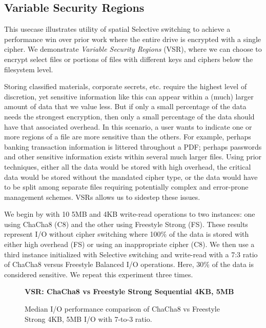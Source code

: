 \subsection{Variable Security Regions} \label{subsec:uc2}

This usecase illustrates utility of spatial Selective switching to achieve a
performance win over prior work where the entire drive is encrypted with a
single cipher. We demonstrate \emph{Variable Security Regions} (VSR), where we
can choose to encrypt select files or portions of files with different keys and
ciphers below the filesystem level.

Storing classified materials, corporate secrets, etc. require the highest level
of discretion, yet sensitive information like this can appear within a (much)
larger amount of data that we value less. But if only a small percentage of the
data needs the strongest encryption, then only a small percentage of the data
should have that associated overhead. In this scenario, a user wants to indicate
one or more regions of a file are more sensitive than the others. For example,
perhaps banking transaction information is littered throughout a PDF; perhaps
passwords and other sensitive information exists within several much larger
files. Using prior techniques, either all the data would be stored with high
overhead, the critical data would be stored without the mandated cipher type, or
the data would have to be split among separate files requiring potentially
complex and error-prone management schemes. \sys VSRs allows us to
sidestep these issues.

We begin by with 10 5MB and 4KB write-read operations to two
\sys instances: one using ChaCha8 (C8) and the other using Freestyle
Strong (FS). These results represent I/O without cipher switching where 100\% of
the data is stored with either high overhead (FS) or using an inappropriate
cipher (C8). We then use a third \sys instance initialized with Selective
switching and write-read with a 7:3 ratio of ChaCha8 versus Freestyle
Balanced I/O operations. Here, 30\% of the data is considered sensitive. We
repeat this experiment three times.

\begin{figure}[ht] \textbf{VSR: ChaCha8 vs Freestyle Strong Sequential
    4KB, 5MB}\par\medskip \centering
  {} \caption{Median I/O performance
    comparison of ChaCha8 vs Freestyle Strong 4KB, 5MB I/O with 7-to-3
    ratio. }
  \label{fig:usecase-vsr-bar}
\end{figure}

